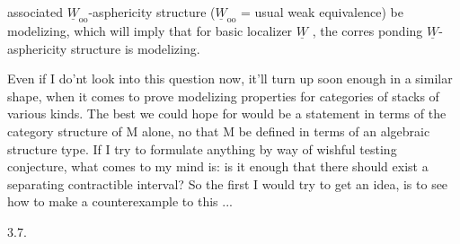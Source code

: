 
associated $\underline{W}_{\mathrm{oo}}$-asphericity structure ($\underline{W}_{\mathrm{oo}}$ = usual weak equivalence)  be
modelizing, which will imply that for \hand{\uline{\textcolor{black}{any}}} basic localizer $\underline{W}$ , the corres%
ponding $\underline{W}$-asphericity structure is modelizing.

Even if I do'nt look into this question now, it'll turn up soon
enough in a similar shape, when it comes to prove modelizing properties
for categories of stacks of various kinds. The best we could hope for
would be a statement in terms of the category structure of M alone,  
no   that M be defined in terms of an algebraic
structure type. If I try to formulate anything by way of wishful
testing conjecture, what comes to my mind is: is it enough that there
should exist a separating contractible interval? So the first I would try
to get an idea, is to see how to make a counterexample to this ...

3.7.

